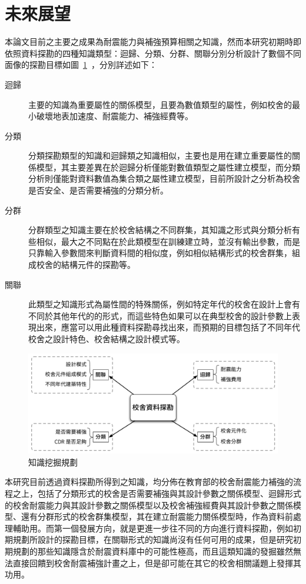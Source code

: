\section{未來展望} 

本論文目前之主要之成果為耐震能力與補強預算相關之知識，然而本研究初期時即依照資料探勘的四種知識類型：迴歸、分類、分群、關聯分別分析設計了數個不同面像的探勘目標如圖~\ref{fig:bigpicture}~，分別詳述如下：

\begin{description}
  \item[迴歸]
  主要的知識為重要屬性的關係模型，且要為數值類型的屬性，例如校舍的最小破壞地表加速度、耐震能力、補強經費等。
  \item[分類]
  分類探勘類型的知識和迴歸類之知識相似，主要也是用在建立重要屬性的關係模型，其主要差異在於迴歸分析僅能對數值類型之屬性建立模型，而分類分析則僅能對資料數值為集合類之屬性建立模型，目前所設計之分析為校舍是否安全、是否需要補強的分類分析。
  \item[分群]
  分群類型之知識主要在於校舍結構之不同群集，其知識之形式與分類分析有些相似，最大之不同點在於此類模型在訓練建立時，並沒有輸出參數，而是只靠輸入參數間來判斷資料間的相似度，例如相似結構形式的校舍群集，組成校舍的結構元件的探勘等。
  \item[關聯]
  此類型之知識形式為屬性間的特殊關係，例如特定年代的校舍在設計上會有不同於其他年代的的形式，而這些特色如果可以在典型校舍的設計參數上表現出來，應當可以用此種資料探勘尋找出來，而預期的目標包括了不同年代校舍之設計特色、校舍結構之設計模式等。
\end{description}

\begin{figure}[hbtp]
  \begin{center}
    \includegraphics[width=1.0\textwidth]{figures/big-picture.pdf}
    \caption{知識挖掘規劃} 
    \label{fig:bigpicture}
  \end{center}
\end{figure}

本研究目前透過資料探勘所得到之知識，均分佈在教育部的校舍耐震能力補強的流程之上，包括了分類形式的校舍是否需要補強與其設計參數之關係模型、迴歸形式的校舍耐震能力與其設計參數之關係模型以及校舍補強經費與其設計參數之關係模型、還有分群形式的校舍群集模型，其在建立耐震能力關係模型時，作為資料前處理輔助用。而第一個發展方向，就是更進一步往不同的方向進行資料探勘，例如初期規劃所設計的探勘目標，在關聯形式的知識尚沒有任何可用的成果，但是研究初期規劃的那些知識隱含於耐震資料庫中的可能性極高，而且這類知識的發掘雖然無法直接回饋到校舍耐震補強計畫之上，但是卻可能在其它的校舍相關議題上發揮其功用。

